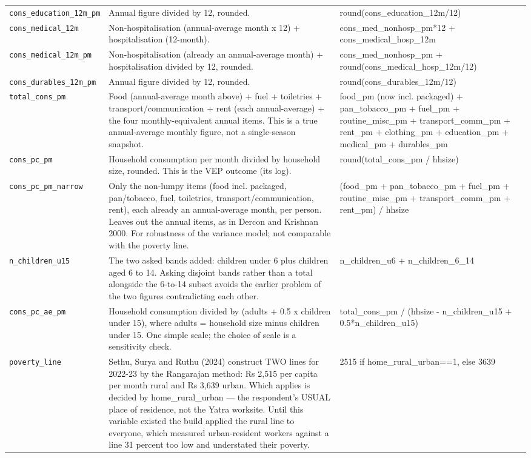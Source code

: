 \documentclass[10pt]{article}
\begin{document}
{\begin{longtable}{p{3.3cm}p{7.6cm}p{5.7cm}}
\texttt{cons\_education\_12m\_pm} & Annual figure divided by 12, rounded. & round(cons\_education\_12m/12) \\
\texttt{cons\_medical\_12m} & Non-hospitalisation (annual-average month x 12) + hospitalisation (12-month). & cons\_med\_nonhosp\_pm*12 + cons\_medical\_hosp\_12m \\
\texttt{cons\_medical\_12m\_pm} & Non-hospitalisation (already an annual-average month) + hospitalisation divided by 12, rounded. & cons\_med\_nonhosp\_pm + round(cons\_medical\_hosp\_12m/12) \\
\texttt{cons\_durables\_12m\_pm} & Annual figure divided by 12, rounded. & round(cons\_durables\_12m/12) \\
\texttt{total\_cons\_pm} & Food (annual-average month above) + fuel + toiletries + transport/communication + rent (each annual-average) + the four monthly-equivalent annual items. This is a true annual-average monthly figure, not a single-season snapshot. & food\_pm (now incl. packaged) + pan\_tobacco\_pm + fuel\_pm + routine\_misc\_pm + transport\_comm\_pm + rent\_pm + clothing\_pm + education\_pm + medical\_pm + durables\_pm \\
\texttt{cons\_pc\_pm} & Household consumption per month divided by household size, rounded. This is the VEP outcome (its log). & round(total\_cons\_pm / hhsize) \\
\texttt{cons\_pc\_pm\_narrow} & Only the non-lumpy items (food incl. packaged, pan/tobacco, fuel, toiletries, transport/communication, rent), each already an annual-average month, per person. Leaves out the annual items, as in Dercon and Krishnan 2000. For robustness of the variance model; not comparable with the poverty line. & (food\_pm + pan\_tobacco\_pm + fuel\_pm + routine\_misc\_pm + transport\_comm\_pm + rent\_pm) / hhsize \\
\texttt{n\_children\_u15} & The two asked bands added: children under 6 plus children aged 6 to 14. Asking disjoint bands rather than a total alongside the 6-to-14 subset avoids the earlier problem of the two figures contradicting each other. & n\_children\_u6 + n\_children\_6\_14 \\
\texttt{cons\_pc\_ae\_pm} & Household consumption divided by (adults + 0.5 x children under 15), where adults = household size minus children under 15. One simple scale; the choice of scale is a sensitivity check. & total\_cons\_pm / (hhsize - n\_children\_u15 + 0.5*n\_children\_u15) \\
\texttt{poverty\_line} & Sethu, Surya and Ruthu (2024) construct TWO lines for 2022-23 by the Rangarajan method: Rs 2,515 per capita per month rural and Rs 3,639 urban. Which applies is decided by home\_rural\_urban — the respondent's USUAL place of residence, not the Yatra worksite. Until this variable existed the build applied the rural line to everyone, which measured urban-resident workers against a line 31 percent too low and understated their poverty. & 2515 if home\_rural\_urban==1, else 3639 \\

\end{longtable}}
\end{document}

